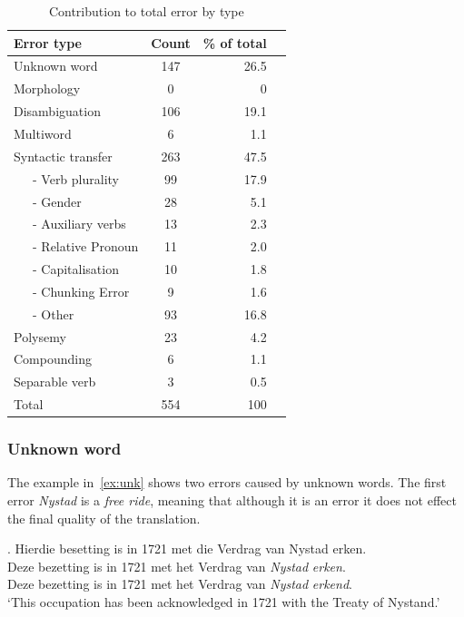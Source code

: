 \documentclass[11pt]{article}
\begin{document}
\begin{table}
  \begin{center}
  \begin{tabular}{|l|c|r|r|}
     \hline
     {\bf Error type}    & {\bf Count} & {\bf \% of total} \\
     \hline
     Unknown word         & 147         & 26.5 \\
     Morphology           & 0           & 0 \\
     Disambiguation       & 106         & 19.1 \\
     Multiword            & 6           & 1.1 \\
     Syntactic transfer   & 263         & 47.5 \\
     ~~~- Verb plurality  & 99          & 17.9 \\
     ~~~- Gender          & 28          & 5.1 \\
     ~~~- Auxiliary verbs & 13          & 2.3 \\ 
     ~~~- Relative Pronoun& 11          & 2.0 \\
     ~~~- Capitalisation  & 10          & 1.8 \\
     ~~~- Chunking Error  & 9           & 1.6 \\
     ~~~- Other           & 93          & 16.8 \\
     Polysemy             & 23          & 4.2 \\
     Compounding          & 6           & 1.1 \\
     Separable verb       & 3           & 0.5 \\
     \hline
     Total                & 554         & 100 \\
     \hline
  \end{tabular}
    \caption{Contribution to total error by type}
    \label{table:qual}
  \end{center}
\end{table}

\subsubsection{Unknown word}

The example in~\ref{ex:unk} shows two errors caused by unknown words. The first error {\em Nystad} 
is a {\em free ride}, meaning that although it is an error it does not effect the final quality
of the translation. 

\ex. \label{ex:unk} 
    Hierdie besetting is in 1721 met die Verdrag van Nystad erken. \\
    Deze bezetting is in 1721 met het Verdrag van {\em *Nystad} {\em *erken}. \\
    Deze bezetting is in 1721 met het Verdrag van {\em Nystad} {\em erkend}. \\
    `This occupation has been acknowledged in 1721 with the Treaty of Nystand.'
\end{document}
